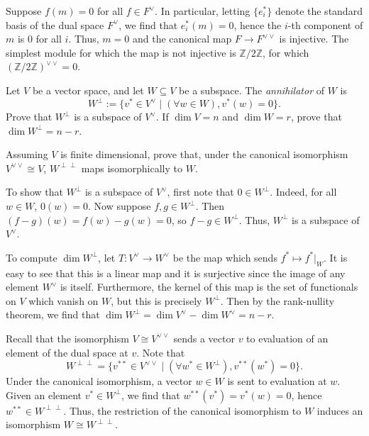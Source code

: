 \documentclass[../../master.tex]{subfiles}
\begin{document}
\begin{solution}
    Suppose $f(m) = 0$ for all $f \in F^{\vee}$.
    In particular, letting $\{e^{*}_i\}$ denote the standard basis of the dual space $F^{\vee}$, we find that $e^{*}_i(m) = 0$, hence the $i$-th component of $m$ is 0 for all $i$.
    Thus, $m = 0$ and the canonical map $F \to F^{\vee \vee}$ is injective.
    The simplest module for which the map is not injective is $\mathbb{Z}/2\mathbb{Z}$, for which $(\mathbb{Z}/2\mathbb{Z})^{\vee \vee} = 0$.
\end{solution}

\begin{problem}
    Let $V$ be a vector space, and let $W \subseteq V$ be a subspace.
    The \textit{annihilator} of $W$ is
    \[
        W^{\perp} := \{v^{*} \in V^{\vee} \mid (\forall w \in W), v^{*}(w) = 0\}.
    \]
    Prove that $W^{\perp}$ is a subspace of $V^{\vee}$.
    If $\dim V = n$ and $\dim W = r$, prove that $\dim W^{\perp} = n-r$.

    Assuming $V$ is finite dimensional, prove that, under the canonical isomorphism $V^{\vee \vee} \cong V$, $W^{\perp \perp}$ maps isomorphically to $W$.
\end{problem}

\begin{solution}
    To show that $W^{\perp}$ is a subspace of $V^{\vee}$, first note that $0 \in W^{\perp}$.
    Indeed, for all $w \in W$, $0(w) = 0$.
    Now suppose $f, g \in W^{\perp}$.
    Then $(f - g)(w) = f(w) - g(w) = 0$, so  $f - g \in W^{\perp}$.
    Thus, $W^{\perp}$ is a subspace of $V^{\vee}$.

    To compute $\dim W^{\perp}$, let $T : V^{\vee} \to W^{\vee}$ be the map which sends $f^{*} \mapsto f^{*}|_W$.
    It is easy to see that this is a linear map and it is surjective since the image of any element $W^{\vee}$ is itself.
    Furthermore, the kernel of this map is the set of functionals on $V$ which vanish on $W$, but this is precisely $W^{\perp}$.
    Then by the rank-nullity theorem, we find that $\dim W^{\perp} = \dim V^{\vee} - \dim W^{\vee} = n - r$.

    Recall that the isomorphism $V \cong V^{\vee \vee}$ sends a vector $v$ to evaluation of an element of the dual space at $v$.
    Note that 
    \[
    W^{\perp \perp} = \{v^{**} \in V^{\vee \vee} \mid (\forall w^{*} \in W^{\perp}),  v^{**}(w^{*}) = 0\}.
    \]
    Under the canonical isomorphism, a vector $w \in W$ is sent to evaluation at $w$.
    Given an element $v^{*} \in W^{\perp}$, we find that $w^{**}(v^{*}) = v^{*}(w) = 0$, hence $w^{**} \in W^{\perp \perp}$.
    Thus, the restriction of the canonical isomorphism to $W$ induces an isomorphism $W \cong W^{\perp \perp}$.
\end{solution}
\end{document}
